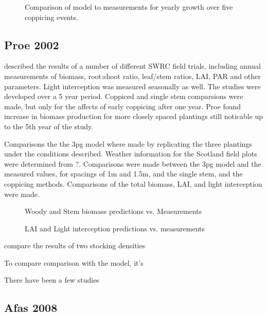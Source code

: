 \documentclass[10pt]{article}
\begin{document}
\begin{figure}[!ht]
  \centering

  \caption{Comparison of model to measurements for yearly growth over five
    coppicing events.}
\label{fig:pont-biomass}
\end{figure}


\subsection*{Proe 2002}

\cite{proe02} described the results of a number of different \ac{SWRC}
field trials, including annual measurements of biomass, root:shoot
ratio, leaf/stem ratios, LAI, PAR and other parameters.  Light
interception was measured seasonally as well.  The studies were
developed over a 5 year period. Coppiced and single stem comparsions
were made, but only for the affects of early coppicing after one year.
Proe found increase in biomass production for more closely spaced
plantings still noticable up to the 5th year of the study.

Comparisons the the \ac{3pg} model where made by replicating the three
plantings under the conditions described.  Weather information for the
Scotland field plots were determined from ?.  Comparisons were made
between the \ac{3pg} model and the measured values, for spacings of 1m and
1.5m, and the single stem, and the coppicing methods.  Comparisons of
the total biomass, LAI, and light interception were made.

\begin{figure}
  \centering
  
  \caption{Woody and Stem biomass predictions vs. Measurements}
  \label{fig:proe-wood}
\end{figure}

\begin{figure}[!ht]
  \centering
  
  \caption{LAI and Light interception predictions vs. measurements}
  \label{fig:proe-light}
\end{figure}

\cite{proe02} compare the results of two stocking densities

To compare comparison with the
model, it's 

There have been a few studies



\subsection{Afas 2008}
\label{Afas2008}
\end{document}
